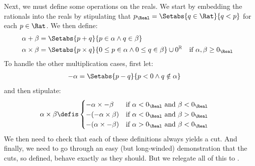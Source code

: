 \documentclass[../../../include/open-logic-section]{subfiles}
\begin{document}
Next, we must define some operations on the reals. We start by
embedding the rationals into the reals by stipulating that $p_\Real =
\Setabs{q \in \Rat}{q < p}$ for each $p \in \Rat$. We then define:
\begin{align*}
	\alpha + \beta &= \Setabs{p + q}{p \in \alpha \land q \in \beta}\\
	\alpha \times \beta &= 
	\Setabs{p \times q}{0 \leq p \in \alpha \land 0 \leq q \in \beta} \cup 0^\mathbb{R} & \text{if }\alpha, \beta \geq 0_\Real
\end{align*}
To handle the other multiplication cases, first let: %
\begin{align*}
	-\alpha &= \Setabs{p - q}{p < 0 \land q \notin \alpha}
\end{align*}
and then stipulate:
\begin{align*}
	\alpha \times \beta &\defis 
	\begin{cases}
		\mathord{-}\alpha \times \mathord{-}\beta &\text{if }\alpha < 0_\Real\text{ and }\beta < 0_\Real\\
		\mathord{-}(\mathord{-}\alpha \times \beta) &\text{if }\alpha < 0_\Real \text{ and }\beta > 0_\Real\\
		\mathord{-}(\alpha \times \mathord{-}\beta) &\text{if }\alpha > 0_\Real \text{ and }\beta < 0_\Real
	\end{cases}
\end{align*}
We then need to check that each of these definitions always yields a
cut. And finally, we need to go through an easy (but long-winded)
demonstration that the cuts, so defined, behave exactly as they
should. But we relegate all of this to .
\end{document}
